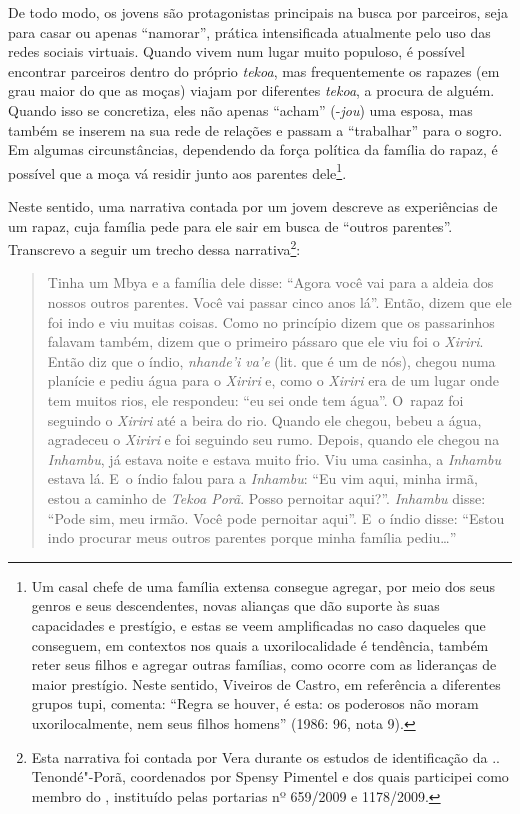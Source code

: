 De todo modo, os jovens são protagonistas principais na busca por
parceiros, seja para casar ou apenas ``namorar'', prática intensificada
atualmente pelo uso das redes sociais virtuais. Quando vivem num lugar
muito populoso, é possível encontrar parceiros dentro do próprio \emph{tekoa},
mas frequentemente os rapazes (em grau maior do que as moças) viajam
por diferentes \emph{tekoa}, a procura de alguém. Quando isso se concretiza,
eles não apenas ``acham'' (-\emph{jou}) uma esposa, mas também se inserem na sua
rede de relações e passam a ``trabalhar'' para o sogro. Em algumas
circunstâncias, dependendo da força política da família do rapaz, é
possível que a moça vá residir junto aos parentes dele\footnote[15]{Um
casal chefe de uma família extensa consegue agregar, por meio dos seus
genros e seus descendentes, novas alianças que dão suporte às suas
capacidades e prestígio, e estas se veem amplificadas no caso daqueles
que conseguem, em contextos nos quais a uxorilocalidade é tendência,
também reter seus filhos e agregar outras famílias, como ocorre com as
lideranças de maior prestígio. Neste sentido, Viveiros de Castro, em
referência a diferentes grupos tupi, comenta: ``Regra se houver, é esta:
os poderosos não moram uxorilocalmente, nem seus filhos homens'' (1986:
96, nota 9).}. 

Neste sentido, uma narrativa contada por um jovem descreve as
experiências de um rapaz, cuja família pede para ele sair em busca de
``outros parentes''. Transcrevo a seguir um trecho dessa
narrativa\footnote[16]{Esta narrativa foi contada por Vera durante os
estudos de identificação da .. Tenondé"-Porã, coordenados por Spensy
Pimentel e dos quais participei como membro do , instituído pelas
portarias nº 659/2009 e 1178/2009.}: 

\begin{quote}
\noindent
Tinha um Mbya e a família dele disse: ``Agora você vai para a aldeia dos
nossos outros parentes. Você vai passar cinco anos lá''. Então, dizem
que ele foi indo e viu muitas coisas. Como no princípio dizem que os
passarinhos falavam também, dizem que o primeiro pássaro que ele viu
foi o \emph{Xiriri}. Então diz que o índio, \emph{nhande’i va’e} (lit. que é um de
nós), chegou numa planície e pediu água para o \emph{Xiriri} e, como o \emph{Xiriri}
era de um lugar onde tem muitos rios, ele respondeu: ``eu sei onde tem
água''. O~rapaz foi seguindo o \emph{Xiriri} até a beira do rio. Quando ele
chegou, bebeu a água, agradeceu o \emph{Xiriri} e foi seguindo seu rumo.
Depois, quando ele chegou na \emph{Inhambu}, já estava noite e estava muito
frio. Viu uma casinha, a \emph{Inhambu} estava lá. E~o índio falou para a
\emph{Inhambu}: ``Eu vim aqui, minha irmã, estou a caminho de \emph{Tekoa Porã}. Posso
pernoitar aqui?''. \emph{Inhambu} disse: ``Pode sim, meu irmão. Você pode
pernoitar aqui''. E~o índio disse: ``Estou indo procurar meus outros
parentes porque minha família pediu\ldots'' 
\end{quote}

